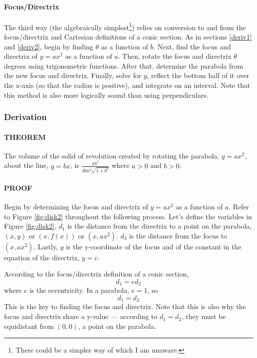 \documentclass{article}
\begin{document}
\paragraph{Focus/Directrix} The third way (the algebraically simplest\footnote{There could be a simpler way of which I am unaware.}) relies on conversion to and from the focus/directrix and Cartesian definitions of a conic section. As in sections \ref{deriv1} and \ref{deriv2}, begin by finding $\theta$ as a function of $b$. Next, find the focus and directrix of $y=ax^2$ as a function of $a$. Then, rotate the focus and directrix $\theta$ degrees using trigonometric functions. After that, determine the parabola from the new focus and directrix. Finally, solve for $y$, reflect the bottom half of it over the x-axis (so that the radius is positive), and integrate on an interval. Note that this method is also more logically sound than using perpendiculars.

\subsubsection{Derivation}
\paragraph{THEOREM} The volume of the solid of revolution created by rotating the parabola, $y=ax^2$, about the line, $y=bx$, is $\frac{\pi b^5}{30a^3\sqrt{1+b^2}}$ where $a>0$ and $b>0$.\par
\smallskip
\paragraph{PROOF} Begin by determining the focus and directrix of $y=ax^2$ as a function of $a$. Refer to Figure \ref{fig:disk2} throughout the following process. Let's define the variables in Figure \ref{fig:disk2}. $d_1$ is the distance from the directrix to a point on the parabola, $\left(x,y\right)$ or $\left(x,f(x)\right)$ or $\left(x,ax^2\right)$. $d_2$ is the distance from the focus to $\left(x,ax^2\right)$. Lastly, $y$ is the y-coordinate of the focus and of the constant in the equation of the directrix, $y=c$.\par
According to the focus/directrix definition of a conic section,$$d_1=ed_2$$ where $e$ is the eccentricity. In a parabola, $e=1$, so$$d_1=d_2$$This is the key to finding the focus and directrix. Note that this is also why the focus and directrix share a y-value --- according to $d_1=d_2$, they must be equidistant from $(0,0)$, a point on the parabola.
\end{document}
